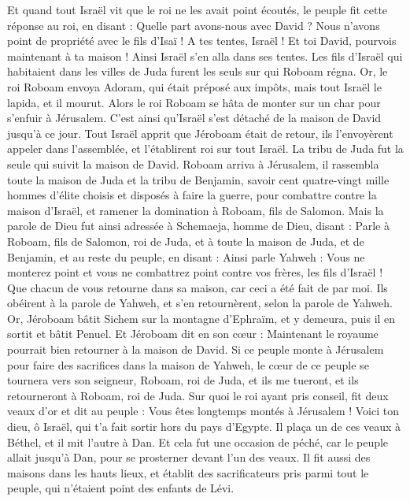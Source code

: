 \begin{multicols}{2}
Et quand tout Israël vit que le roi ne les avait point écoutés, le peuple fit cette réponse au roi, en disant : Quelle part avons-nous avec David ? Nous n'avons point de propriété avec le fils d'Isaï ! A tes tentes, Israël ! Et toi David, pourvois maintenant à ta maison ! Ainsi Israël s'en alla dans ses tentes.
Les fils d'Israël qui habitaient dans les villes de Juda furent les seuls sur qui Roboam régna.
Or, le roi Roboam envoya Adoram, qui était préposé aux impôts, mais tout Israël le lapida, et il mourut. Alors le roi Roboam se hâta de monter sur un char pour s'enfuir à Jérusalem.
C’est ainsi qu’Israël s’est détaché de la maison de David jusqu'à ce jour.
Tout Israël apprit que Jéroboam était de retour, ils l'envoyèrent appeler dans l'assemblée, et l'établirent roi sur tout Israël. La tribu de Juda fut la seule qui suivit la maison de David.
Roboam arriva à Jérusalem, il rassembla toute la maison de Juda et la tribu de Benjamin, savoir cent quatre-vingt mille hommes d’élite choisis et disposés à faire la guerre, pour combattre contre la maison d'Israël, et ramener la domination à Roboam, fils de Salomon.
Mais la parole de Dieu fut ainsi adressée à Schemaeja, homme de Dieu, disant :
Parle à Roboam, fils de Salomon, roi de Juda, et à toute la maison de Juda, et de Benjamin, et au reste du peuple, en disant :
Ainsi parle Yahweh : Vous ne monterez point et vous ne combattrez point contre vos frères, les fils d'Israël ! Que chacun de vous retourne dans sa maison, car ceci a été fait de par moi. Ils obéirent à la parole de Yahweh, et s'en retournèrent, selon la parole de Yahweh.
Or, Jéroboam bâtit Sichem sur la montagne d'Ephraïm, et y demeura, puis il en sortit et bâtit Penuel.
Et Jéroboam dit en son cœur : Maintenant le royaume pourrait bien retourner à la maison de David.
Si ce peuple monte à Jérusalem pour faire des sacrifices dans la maison de Yahweh, le cœur de ce peuple se tournera vers son seigneur, Roboam, roi de Juda, et ils me tueront, et ils retourneront à Roboam, roi de Juda.
Sur quoi le roi ayant pris conseil, fit deux veaux d'or et dit au peuple : Vous êtes longtemps montés à Jérusalem ! Voici ton dieu, ô Israël, qui t'a fait sortir hors du pays d'Egypte.
Il plaça un de ces veaux à Béthel, et il mit l'autre à Dan.
Et cela fut une occasion de péché, car le peuple allait jusqu'à Dan, pour se prosterner devant l'un des veaux.
Il fit aussi des maisons dans les hauts lieux, et établit des sacrificateurs pris parmi tout le peuple, qui n'étaient point des enfants de Lévi.

\end{multicols}
